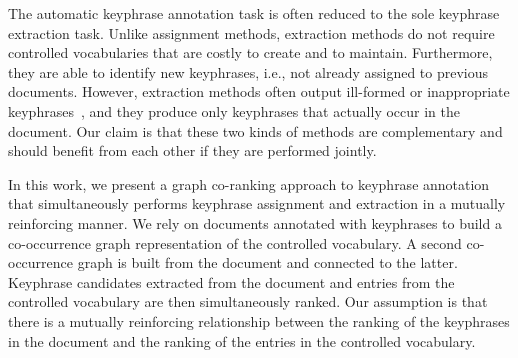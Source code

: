   
  The automatic keyphrase annotation task is often reduced to the sole 
  keyphrase extraction task. 
  Unlike assignment methods, extraction methods do not require controlled 
  vocabularies that are costly to create and to maintain. 
  Furthermore, they are able to identify new keyphrases, i.e., not 
  already assigned to previous documents.
  However, extraction methods often output ill-formed or inappropriate
  keyphrases~\cite{medelyan2008smalltrainingset}, and they produce only
  keyphrases that actually occur in the document.
  Our claim is that these two kinds of methods are complementary and 
  should benefit from each other if they are performed jointly.
  
  In this work, we present a graph co-ranking approach to keyphrase 
  annotation that simultaneously performs keyphrase assignment and 
  extraction in a mutually reinforcing manner.
  We rely on documents annotated with keyphrases to build a co-occurrence 
  graph representation of the controlled vocabulary.
  A second co-occurrence graph is built from the document and connected 
  to the latter.
  Keyphrase candidates extracted from the document and entries 
  from the controlled vocabulary are then simultaneously ranked.
  Our assumption is that there is a mutually reinforcing relationship between
  the ranking of the keyphrases in the document and the ranking of
  the entries in the controlled vocabulary.
  

